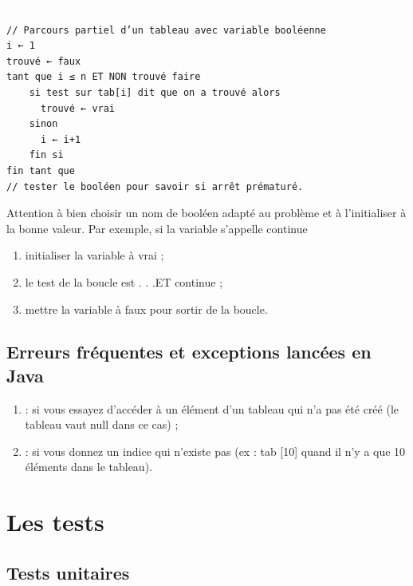 \documentclass[11pt,a4paper]{article}
\begin{document}
					\textcolor{white}{.} \par
				
            \par
        \begin{verbatim}
// Parcours partiel d’un tableau avec variable booléenne
i ← 1
trouvé ← faux
tant que i ≤ n ET NON trouvé faire
    si test sur tab[i] dit que on a trouvé alors
      trouvé ← vrai
    sinon
      i ← i+1
    fin si
fin tant que
// tester le booléen pour savoir si arrêt prématuré.
      \end{verbatim}
        Attention \`a bien choisir un nom de bool\'een adapt\'e au probl\`eme et \`a l'initialiser \`a la bonne
        valeur. Par exemple, si la variable s'appelle \guillemotleft  continue \guillemotright 
        
					\begin{enumerate}
				
			\item initialiser la variable \`a vrai ;
			\item le test de la boucle est \guillemotleft  . . .ET continue \guillemotright  ;
			\item mettre la variable \`a faux pour sortir de la boucle.
					\end{enumerate}
				
            \par
        \subsection{Erreurs fr\'equentes et exceptions lanc\'ees en Java}
					\begin{enumerate}
				
			\item \verb@NullPointerException@ : 
            si vous essayez d'acc\'eder \`a un \'el\'ement d'un tableau qui n'a pas \'et\'e cr\'e\'e
            (le tableau vaut null dans ce cas) ;
          
			\item \verb@ArrayIndexOutOfBoundsException@ : 
            si vous donnez un indice qui n'existe pas (ex : tab [10] quand il n'y a que 10 \'el\'ements dans le tableau).
          
					\end{enumerate}
				
            \par
        \section{Les tests}\subsection{Tests unitaires}
			
\end{document}
